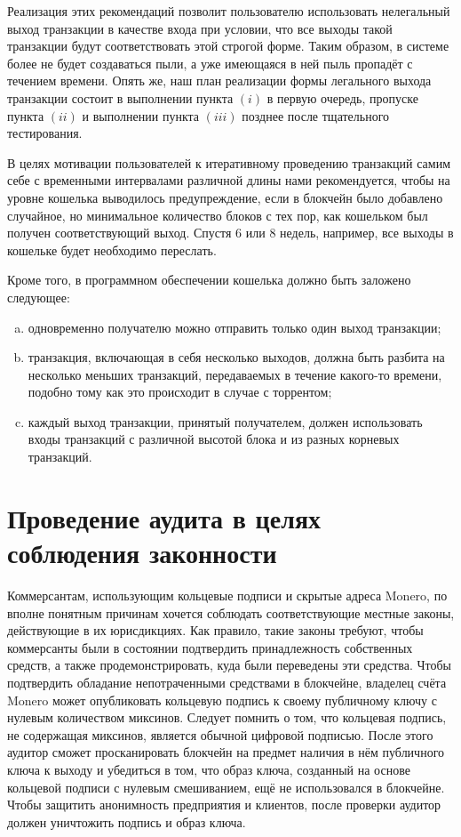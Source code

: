 \documentclass{mrl}
\begin{document}
Реализация этих рекомендаций позволит пользователю использовать нелегальный выход транзакции в качестве входа при условии, что все выходы такой транзакции будут соответствовать этой строгой форме. Таким образом, в системе более не будет создаваться пыли, а уже имеющаяся в ней пыль пропадёт с течением времени. Опять же, наш план реализации формы легального выхода транзакции состоит в выполнении пункта $(i)$ в первую очередь, пропуске пункта $(ii)$ и выполнении пункта $(iii)$ позднее после тщательного тестирования.

В целях мотивации пользователей к итеративному проведению транзакций самим себе с временными интервалами различной длины нами рекомендуется, чтобы на уровне кошелька выводилось предупреждение, если в блокчейн было добавлено случайное, но минимальное количество блоков с тех пор, как кошельком был получен соответствующий выход. Спустя $6$ или $8$ недель, например, все выходы в кошельке будет необходимо переслать.

Кроме того, в программном обеспечении кошелька должно быть заложено следующее:
\begin{enumerate}[(a)]
\item одновременно получателю можно отправить только один выход транзакции;
\item транзакция, включающая в себя несколько выходов, должна быть разбита на несколько меньших транзакций, передаваемых в течение какого-то времени, подобно тому как это происходит в случае с торрентом;
\item каждый выход транзакции, принятый получателем, должен использовать входы транзакций с различной высотой блока и из разных корневых транзакций.
\end{enumerate}

\section{Проведение аудита в целях соблюдения законности}\label{auditability}

Коммерсантам, использующим кольцевые подписи и скрытые адреса Monero, по вполне понятным причинам хочется соблюдать соответствующие местные законы, действующие в их юрисдикциях. Как правило, такие законы требуют, чтобы коммерсанты были в состоянии подтвердить принадлежность собственных средств, а также продемонстрировать, куда были переведены эти средства. Чтобы подтвердить обладание непотраченными средствами в блокчейне, владелец счёта Monero может опубликовать кольцевую подпись к своему публичному ключу с нулевым количеством миксинов. Следует помнить о том, что кольцевая подпись, не содержащая миксинов, является обычной цифровой подписью. После этого аудитор сможет просканировать блокчейн на предмет наличия в нём публичного ключа к выходу и убедиться в том, что образ ключа, созданный на основе кольцевой подписи с нулевым смешиванием, ещё не использовался в блокчейне. Чтобы защитить анонимность предприятия и клиентов, после проверки аудитор должен уничтожить подпись и образ ключа.
\end{document}
